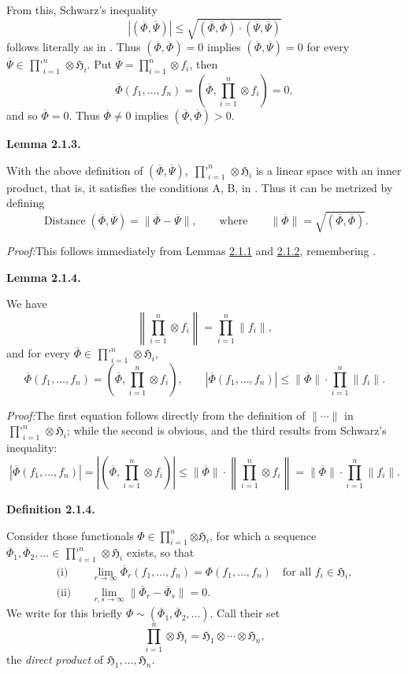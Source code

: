 \documentclass[12pt,b5paper,twoside]{article}
\newcommand{\Hspace}{\mathfrak H}
\newcommand{\Definition}[1]{%
  \par\smallskip\noindent\phantomsection\label{def:#1}\textbf{Definition #1.}\enspace
}
\newcommand{\Lemma}[1]{%
  \par\smallskip\noindent\phantomsection\label{lem:#1}\textbf{Lemma #1.}\enspace
}
\newcommand{\Proof}{\par\noindent\textit{Proof:}\enspace}
\begin{document}
From this, Schwarz's inequality
\[
 |(\overline{\Phi},\overline{\Psi})|
 \leq\sqrt{(\overline{\Phi},\overline{\Phi})
 \cdot(\overline{\Psi},\overline{\Psi})}
\]
follows literally as in \cite[p.~64]{ref16}. Thus
$(\overline{\Phi},\overline{\Phi})=0$ implies
$(\overline{\Phi},\overline{\Psi})=0$ for every
$\overline{\Psi}\in\mathop{\prod\nolimits'}_{i=1}^{n}\otimes\Hspace_i$.
Put $\overline{\Psi}=\prod_{i=1}^{n}\otimes f_i$, then
\[
 \overline{\Phi}(f_1,\ldots,f_n)
   =\left(\overline{\Phi},\prod_{i=1}^{n}\otimes f_i\right)=0,
\]
and so $\overline{\Phi}=0$. Thus $\overline{\Phi}\ne0$ implies
$(\overline{\Phi},\overline{\Phi})>0$.

\Lemma{2.1.3}
With the above definition of $(\overline{\Phi},\overline{\Psi})$,
$\mathop{\prod\nolimits'}_{i=1}^{n}\otimes\Hspace_i$ is a linear space with
an inner product, that is, it satisfies the conditions A, B, in
\cite[p.~64]{ref16}. Thus it can be metrized by defining
\[
 \operatorname{Distance}(\overline{\Phi},\overline{\Psi})
 =\lVert\overline{\Phi}-\overline{\Psi}\rVert,
 \qquad\text{where}\qquad
 \lVert\overline{\Phi}\rVert
 =\sqrt{(\overline{\Phi},\overline{\Phi})}.
\]

\Proof This follows immediately from Lemmas
\hyperref[lem:2.1.1]{2.1.1} and \hyperref[lem:2.1.2]{2.1.2}, remembering
\cite[pp.~64--65]{ref16}.

\Lemma{2.1.4}
We have
\[
 \left\lVert\prod_{i=1}^{n}\otimes f_i\right\rVert
   =\prod_{i=1}^{n}\lVert f_i\rVert,
\]
and for every $\overline{\Phi}\in\mathop{\prod\nolimits'}_{i=1}^{n}
\otimes\Hspace_i$,
\[
 \overline{\Phi}(f_1,\ldots,f_n)
   =\left(\overline{\Phi},\prod_{i=1}^{n}\otimes f_i\right),
 \qquad
 |\overline{\Phi}(f_1,\ldots,f_n)|
   \leq\lVert\overline{\Phi}\rVert\cdot
   \prod_{i=1}^{n}\lVert f_i\rVert.
\]

\Proof The first equation follows directly from the definition of
$\lVert\cdots\rVert$ in
$\mathop{\prod\nolimits'}_{i=1}^{n}\otimes\Hspace_i$; while the second is
obvious, and the third results from Schwarz's inequality:
\[
 |\overline{\Phi}(f_1,\ldots,f_n)|
 =\left|\left(\overline{\Phi},\prod_{i=1}^{n}\otimes f_i\right)\right|
 \leq\lVert\overline{\Phi}\rVert\cdot
      \left\lVert\prod_{i=1}^{n}\otimes f_i\right\rVert
 =\lVert\overline{\Phi}\rVert\cdot\prod_{i=1}^{n}\lVert f_i\rVert.
\]

\Definition{2.1.4}
Consider those functionals
$\Phi\in\prod_{i=1}^{n}\bm{\otimes}\Hspace_i$, for which a sequence
$\overline{\Phi}_1,\overline{\Phi}_2,\ldots\in
\mathop{\prod\nolimits'}_{i=1}^{n}\otimes\Hspace_i$ exists, so that
\begin{align*}
 \text{(i)}\quad &
 \lim_{r\to\infty}\overline{\Phi}_r(f_1,\ldots,f_n)
 =\Phi(f_1,\ldots,f_n)
   \quad\text{for all }f_i\in\Hspace_i,\\
 \text{(ii)}\quad &
 \lim_{r,s\to\infty}\lVert\overline{\Phi}_r-
 \overline{\Phi}_s\rVert=0.
\end{align*}
We write for this briefly
$\Phi\sim(\overline{\Phi}_1,\overline{\Phi}_2,\ldots)$. Call their set
\[
 \prod_{i=1}^{n}\otimes\Hspace_i
   =\Hspace_1\otimes\cdots\otimes\Hspace_n,
\]
the \emph{direct product} of $\Hspace_1,\ldots,\Hspace_n$.
\end{document}
